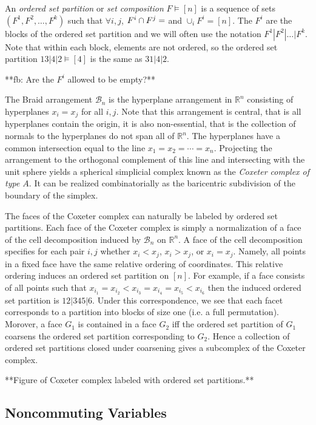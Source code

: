 \documentclass[11pt,letter]{amsart}
\begin{document}
An \emph{ordered set partition} or \emph{set composition} $F \vDash
[n]$ is a sequence of sets $(F^1,F^2, \ldots, F^k)$ such that $\forall
i,j$, $ F^i \cap F^j = \empty$ and $\cup_i F^i = [n]$.  The $F^i$ are the
blocks of the ordered set partition and we will often use the notation
$F^1 | F^2 | \ldots | F^k$.  Note that within each block, elements are
not ordered, so the ordered set partition $13|4|2 \vDash [4]$ is the
same as $31|4|2$.

**fb: Are the $F^i$ allowed to be empty?**


The Braid arrangement $\mathcal{B}_n$ is the hyperplane arrangement in
$\mathbb{R}^n$ consisting of hyperplanes $x_i = x_j$ for all $i,j$.
Note that this arrangement is central, that is all hyperplanes contain
the origin, it is also non-essential, that is the collection of
normals to the hyperplanes do not span all of $\mathbb{R}^n$.  The
hyperplanes have a common intersection equal to the line $x_1 = x_2 = \cdots
= x_n$.  Projecting the arrangement to the orthogonal complement of
this line and intersecting with the unit sphere yields a spherical
simplicial complex known as the \emph{Coxeter complex of type $A$}.
It can be realized combinatorially as the baricentric subdivision of the
boundary of the simplex.


The faces of the Coxeter complex can naturally be labeled by ordered
set partitions.  Each face of the Coxeter complex is simply a
normalization of a face of the cell decomposition induced by
$\mathcal{B}_n$ on $\mathbb{R}^n$.  A face of the cell decomposition specifies for each pair $i,j$ whether $x_i < x_j$, $x_i > x_j$, or $x_i = x_j$.  Namely, all points in a fixed face have
the same relative ordering of coordinates.  This relative ordering
induces an ordered set partition on $[n]$.  For example, if a face
consists of all points such that $x_{i_1} = x_{i_2} < x_{i_3} =
x_{i_4} = x_{i_5} < x_{i_6}$ then the induced ordered set partition is
$12|345|6$.  Under this correspondence, we see that each facet
corresponds to a partition into blocks of size one (i.e. a full
permutation).  Morover, a face $G_1$ is contained in a face $G_2$ iff
the ordered set partition of $G_1$ coarsens the ordered set partition
corresponding to $G_2$.  Hence a collection of ordered set partitions
closed under coarsening gives a subcomplex of the Coxeter complex.


**Figure of Coxeter complex labeled with ordered set partitions.**

\subsection{Noncommuting Variables}
\end{document}
